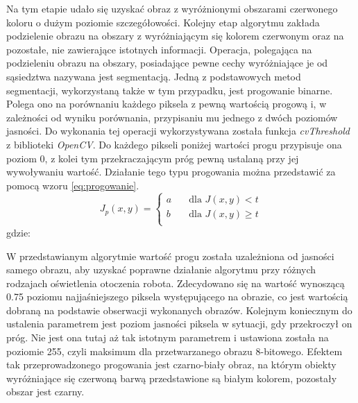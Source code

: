 Na tym etapie udało się uzyskać obraz z wyróżnionymi obszarami czerwonego koloru o dużym poziomie szczegółowości. Kolejny etap algorytmu zakłada podzielenie obrazu na obszary z wyróżniającym się kolorem czerwonym oraz na pozostałe, nie zawierające istotnych informacji. Operacja, polegająca na podzieleniu obrazu na obszary, posiadające pewne cechy wyróżniające je od sąsiedztwa nazywana jest segmentacją\cite{Malina}. Jedną z podstawowych metod segmentacji, wykorzystaną także w tym przypadku, jest progowanie binarne. Polega ono na porównaniu każdego piksela z pewną wartością progową i, w zależności od wyniku porównania, przypisaniu mu jednego z dwóch poziomów jasności. Do wykonania tej operacji wykorzystywana została funkcja \textit{cvThreshold} z biblioteki \textit{OpenCV}. Do każdego pikseli poniżej wartości progu przypisuje ona poziom 0, z kolei tym przekraczającym próg pewną ustalaną przy jej wywoływaniu wartość. Działanie tego typu progowania można przedstawić za pomocą wzoru \ref{eq:progowanie}.
\begin{equation}
J_p(x, y) =
  \begin{cases}
    a	& \quad \text{dla } J(x, y) < t\\
    b	& \quad \text{dla } J(x, y) \geq t\\
  \end{cases}
\label{eq:progowanie}
\end{equation}
gdzie:
\begin{equationDescriptor}
\end{equationDescriptor}
W przedstawianym algorytmie wartość progu została uzależniona od jasności samego obrazu, aby uzyskać poprawne działanie algorytmu przy różnych rodzajach oświetlenia otoczenia robota. Zdecydowano się na wartość wynoszącą 0.75 poziomu najjaśniejszego piksela występującego na obrazie, co jest wartością dobraną na podstawie obserwacji wykonanych obrazów. Kolejnym koniecznym do ustalenia parametrem jest poziom jasności piksela w sytuacji, gdy przekroczył on próg. Nie jest ona tutaj aż tak istotnym parametrem i ustawiona została na poziomie 255, czyli maksimum dla przetwarzanego obrazu 8-bitowego. Efektem tak przeprowadzonego progowania jest czarno-biały obraz, na którym obiekty wyróżniające się czerwoną barwą przedstawione są białym kolorem, pozostały obszar jest czarny.

